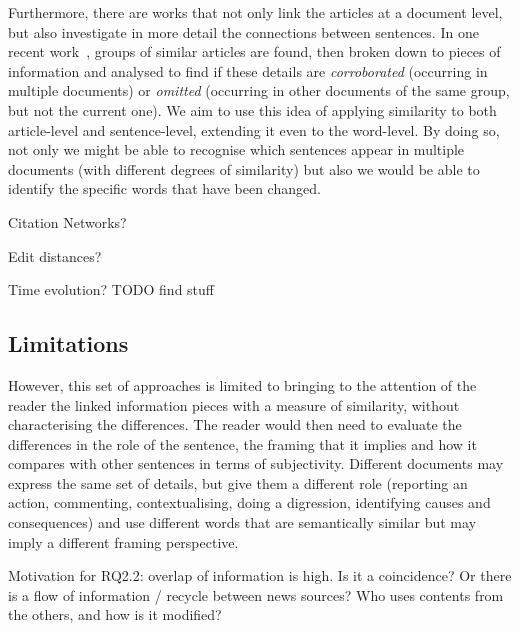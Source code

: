 Furthermore, there are works that not only link the articles at a document level, but also investigate in more detail the connections between sentences.
In one recent work~\cite{bountouridis2018explaining}, groups of similar articles are found, then broken down to pieces of information and analysed to find if these details are \emph{corroborated} (occurring in multiple documents) or \emph{omitted} (occurring in other documents of the same group, but not the current one). 
We aim to use this idea of applying similarity to both article-level and sentence-level, extending it even to the word-level. By doing so,
not only we might be able to recognise which sentences appear in multiple documents (with different degrees of similarity) but also we would be able to identify the specific words that have been changed.




Citation Networks?

Edit distances?

Time evolution? TODO find stuff

\subsection{Limitations}
\label{ssec:lit_relationships_limitations}

However, this set of approaches is limited to bringing to the attention of the reader the linked information pieces with a measure of similarity, without characterising the differences. The reader would then need to evaluate the differences in the role of the sentence, the framing that it implies and how it compares with other sentences in terms of subjectivity.
Different documents may express the same set of details, but give them a different role (reporting an action, commenting, contextualising, doing a digression, identifying causes and consequences) and use different words that are semantically similar but may imply a different framing perspective.



Motivation for RQ2.2: overlap of information is high. Is it a coincidence? Or there is a flow of information / recycle between news sources? Who uses contents from the others, and how is it modified?




